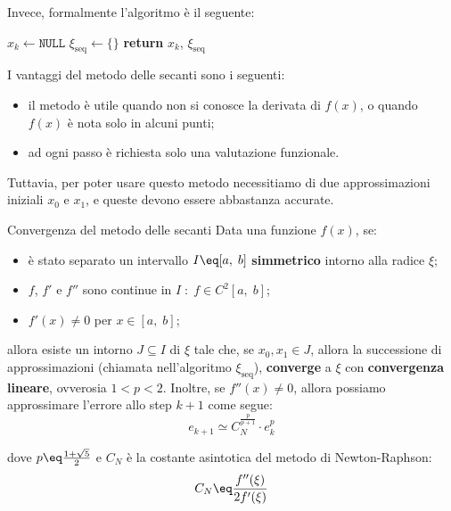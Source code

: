 Invece, formalmente l'algoritmo è il seguente:
\nwl
\begin{algorithm}[H]
    \caption{Metodo delle secanti con estremo variabile}
    $x_k \gets \texttt{NULL}$\;
    $\xi_{\text{seq}} \gets \{\}$\;
    \BlankLine
    \textbf{return} $x_k$, $\xi_{\text{seq}}$
\end{algorithm}
\nwl
I vantaggi del metodo delle secanti sono i seguenti:
\begin{itemize}
    \item il metodo è utile quando non si conosce la derivata di $f(x)$, o quando $f(x)$ è nota solo in alcuni punti;
    \item ad ogni passo è richiesta solo una valutazione funzionale.
\end{itemize}

Tuttavia, per poter usare questo metodo necessitiamo di due approssimazioni iniziali $x_0$ e $x_1$, e queste devono essere abbastanza accurate.

\begin{theorem}{Convergenza del metodo delle secanti}
    Data una funzione $f(x)$, se:
    \begin{itemize}
        \item è stato separato un intervallo $I \eq [a, \; b]$ \textbf{simmetrico} intorno alla radice $\xi$;
        \item $f$, $f'$ e $f''$ sono continue in $I \; : \; f \in C^2 [a, \; b]$;
        \item $f'(x) \neq 0$ per $x \in [a, \; b]$;
    \end{itemize}
    allora esiste un intorno $J \subseteq I$ di $\xi$ tale che, se $x_0, x_1 \in J$, allora la successione di approssimazioni (chiamata nell'algoritmo $\xi_{\text{seq}}$), \textbf{converge} a $\xi$ con \textbf{convergenza lineare}, ovverosia $1 < p < 2$.
    \nwl
    Inoltre, se $f''(x) \neq 0$, allora possiamo approssimare l'errore allo step $k + 1$ come segue:
    \[ e_{k + 1} \simeq C_N^{\frac{p}{p + 1}} \cdot e_k^p \]

    dove $p \eq \frac{1 + \sqrt{5}}{2}$ e $C_N$ è la costante asintotica del metodo di Newton-Raphson:
    \[ C_N \eq \frac{f''(\xi)}{2f'(\xi)} \]
\end{theorem}

